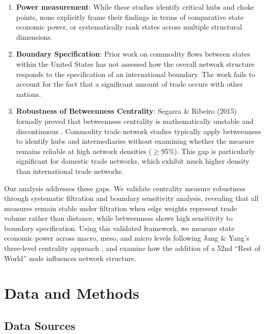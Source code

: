 \documentclass[12pt,oneside]{book}
\begin{document}
\begin{enumerate}
    
    \item \textbf{Power measurement}: While these studies identify critical hubs and choke points, none explicitly frame their findings in terms of comparative state economic power, or systematically rank states across multiple structural dimensions. 

    \item \textbf{Boundary Specification}: Prior work on commodity flows between states within the United States has not assessed how the overall network structure responds to the specification of an international boundary. The work fails to account for the fact that a significant amount of trade occurs with other nations.        

    \item \textbf{Robustness of Betweenness Centrality}: Segarra \& Ribeiro (2015) formally proved that betweenness centrality is mathematically unstable and discontinuous \cite{segarra_stability_2015}. Commodity trade network studies typically apply betweenness to identify hubs and intermediaries without examining whether the measure remains reliable at high network densities ($\geq$95\%). This gap is particularly significant for domestic trade networks, which exhibit much higher density than international trade networks.

  
    
\end{enumerate}

Our analysis addresses these gaps. We validate centrality measure robustness through systematic filtration and boundary sensitivity analysis, revealing that all measures remain stable under filtration when edge weights represent trade volume rather than distance, while betweenness shows high sensitivity to boundary specification. Using this validated framework, we measure state economic power across macro, meso, and micro levels following Jang \& Yang's three-level centrality approach \cite{jang_network_2020, jang_measuring_2023}, and examine how the addition of a 52nd ``Rest of World'' node influences network structure.

\chapter{Data and Methods}
\label{sec:methods} 


\section{Data Sources}
\end{document}
